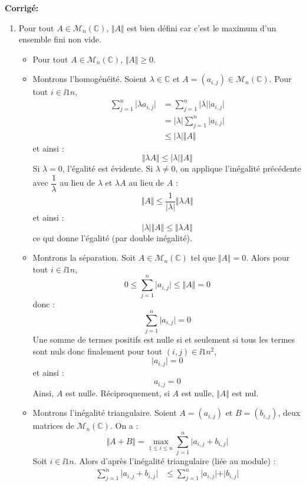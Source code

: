 \documentclass[a4paper,twoside,french,11pt]{VcCours}
\newcommand{\corr}{\textbf{Corrigé:}}
\begin{document}
\corr 

\begin{enumerate}
\item Pour tout $A \in \mathcal{M}_n(\mathbb{C})$, $\Vert A \Vert$ est bien défini car c'est le maximum d'un ensemble fini non vide.

\begin{itemize}
\item Pour tout $A \in \mathcal{M}_n(\mathbb{C})$, $\Vert A \Vert \geq 0$.
\item Montrons l'homogénéité. Soient $\lambda \in \mathbb{C}$ et $A=(a_{i,j}) \in \mathcal{M}_n(\mathbb{C})$. Pour tout $i \in \ii{1}{n}$,
\begin{align*}
 \sum_{j=1}^n \vert \lambda a_{i,j} \vert & =  \sum_{j=1}^n \vert \lambda \vert \vert a_{i,j} \vert \\
 & =  \vert \lambda \vert \sum_{j=1}^n \vert a_{i,j} \vert \\
 & \leq \vert \lambda \vert \Vert A \Vert
 \end{align*}
 et ainsi :
 $$ \Vert \lambda A \Vert \leq \vert \lambda \vert \Vert A \Vert$$
 Si $\lambda=0$, l'égalité est évidente. Si $\lambda \neq 0$, on applique l'inégalité précédente avec $\dfrac{1}{\lambda}$ au lieu de $\lambda$ et $\lambda A$ au lieu de $A$ :
 $$ \Vert A \Vert \leq \dfrac{1}{\vert \lambda \vert} \Vert \lambda A \Vert$$
 et ainsi :
 $$  \vert \lambda \vert \Vert A \Vert \leq \Vert \lambda A \Vert$$
 ce qui donne l'égalité (par double inégalité).
 \item Montrons la séparation. Soit $A \in \mathcal{M}_n(\mathbb{C})$ tel que $\Vert A \Vert =0$. Alors pour tout $i \in \ii{1}{n}$,
$$ 0 \leq \sum_{j=1}^n \vert a_{i,j} \vert \leq \Vert A \Vert = 0$$
donc :
$$ \sum_{j=1}^n \vert a_{i,j} \vert = 0$$
Une somme de termes positifs est nulle si et seulement si tous les termes sont nuls donc finalement pour tout $(i,j) \in \ii{1}{n}^2$,
$$  \vert a_{i,j} \vert = 0$$
et ainsi :
$$ a_{i,j}=0$$
Ainsi, $A$ est nulle. Réciproquement, si $A$ est nulle, $\Vert A \Vert$ est nul.
\item Montrons l'inégalité triangulaire. Soient $A=(a_{i,j})$ et $B=(b_{i,j})$, deux matrices de $\mathcal{M}_n(\mathbb{C})$. On a :
$$ \Vert A+B \Vert = \max_{1 \leq i \leq n} \sum_{j=1}^n \vert a_{i,j}+ b_{i,j} \vert$$
Soit $i \in \ii{1}{n}$. Alors d'après l'inégalité triangulaire (liée au module) :
\begin{align*}
 \sum_{j=1}^n \vert a_{i,j}+ b_{i,j} \vert &  \leq \sum_{j=1}^n \vert a_{i,j} \vert + \vert b_{i,j} \vert \\

\end{align*}
\end{itemize}
\end{enumerate}
\end{document}
